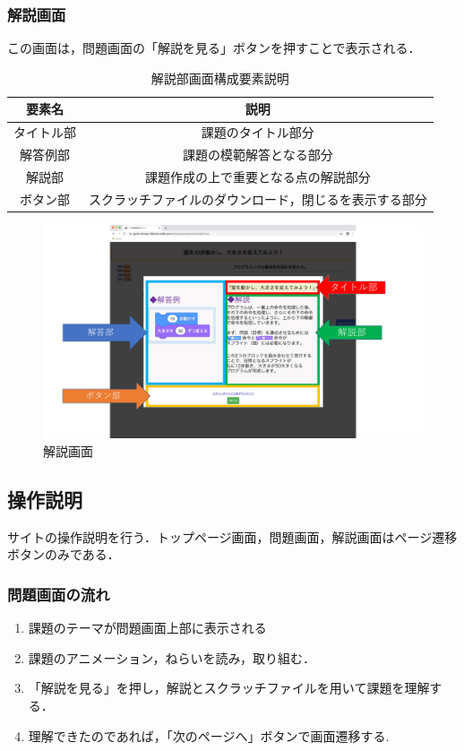 \subsubsection{解説画面}
この画面は，問題画面の「解説を見る」ボタンを押すことで表示される．
\begin{table}[htb]
\begin{center}
    \caption{解説部画面構成要素説明}
  \begin{tabular}{|c|c|} \hline
     要素名  & 説明  \\ \hline
     タイトル部& 課題のタイトル部分 \\ \hline
      解答例部& 課題の模範解答となる部分 \\ \hline
      解説部& 課題作成の上で重要となる点の解説部分 \\ \hline
      ボタン部& スクラッチファイルのダウンロード，閉じるを表示する部分\\ \hline
  \end{tabular}
  \label{tab:bamen1}
  \end{center}
\end{table}
\begin{figure}[h]
\begin{center}
\includegraphics[width=15cm]{mondaikotae.pdf}
\caption{解説画面}
\label{fig:houhou}
\end{center}
\end{figure}

\subsection{操作説明}
サイトの操作説明を行う．トップページ画面，問題画面，解説画面はページ遷移ボタンのみである．
\subsubsection{問題画面の流れ}
\begin{enumerate}
 \item 課題のテーマが問題画面上部に表示される
 \item 課題のアニメーション，ねらいを読み，取り組む．
 \item 「解説を見る」を押し，解説とスクラッチファイルを用いて課題を理解する．
 \item 理解できたのであれば，「次のページへ」ボタンで画面遷移する. 
\end{enumerate}















